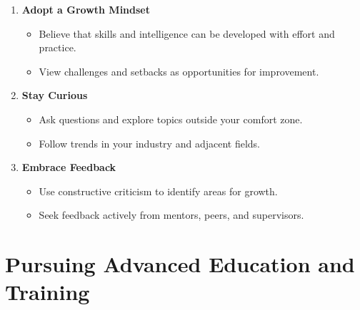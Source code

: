 \documentclass[
  letterpaper,
  DIV=11,
  numbers=noendperiod]{scrreprt}
\providecommand{\tightlist}{%
  \setlength{\itemsep}{0pt}\setlength{\parskip}{0pt}}\usepackage{longtable,booktabs,array}
\begin{document}
\begin{enumerate}
\def\labelenumi{\arabic{enumi}.}
\item
  \textbf{Adopt a Growth Mindset}

  \begin{itemize}
  \tightlist
  \item
    Believe that skills and intelligence can be developed with effort
    and practice.
  \item
    View challenges and setbacks as opportunities for improvement.
  \end{itemize}
\item
  \textbf{Stay Curious}

  \begin{itemize}
  \tightlist
  \item
    Ask questions and explore topics outside your comfort zone.
  \item
    Follow trends in your industry and adjacent fields.
  \end{itemize}
\item
  \textbf{Embrace Feedback}

  \begin{itemize}
  \tightlist
  \item
    Use constructive criticism to identify areas for growth.
  \item
    Seek feedback actively from mentors, peers, and supervisors.
  \end{itemize}
\end{enumerate}

\section{Pursuing Advanced Education and
Training}\label{pursuing-advanced-education-and-training}
\end{document}

